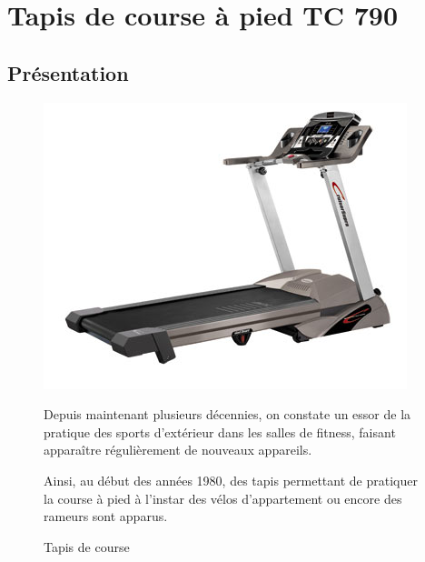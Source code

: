 

\section{Tapis de course à pied TC 790}

\subsection{Présentation}

\begin{figure}[!h]
  \begin{minipage}{0.35\linewidth}
  \centering\includegraphics[width=0.8\linewidth]{img/tapis.jpg}
  \caption{Tapis de course}
  \label{img4}
  \end{minipage}
  \hfill
  \begin{minipage}{0.60\linewidth}
Depuis maintenant plusieurs décennies, on constate un essor de la pratique des sports d'extérieur dans les salles de fitness, faisant apparaître régulièrement de nouveaux appareils.

Ainsi, au début des années 1980, des tapis permettant de pratiquer la course à pied à l'instar des vélos d'appartement ou encore des rameurs sont apparus.
\end{minipage}
\end{figure}

